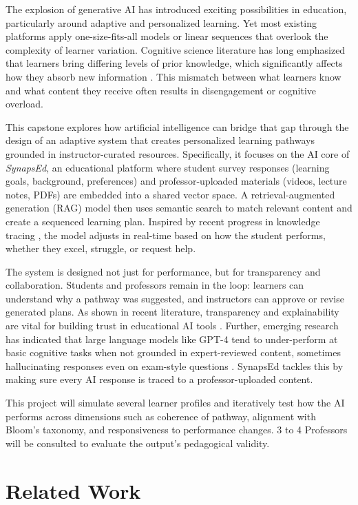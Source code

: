 \documentclass{stylefiles/capstone}
\begin{document}
The explosion of generative AI has introduced exciting possibilities in education, particularly around adaptive and personalized learning. Yet most existing platforms apply one-size-fits-all models or linear sequences that overlook the complexity of learner variation. Cognitive science literature has long emphasized that learners bring differing levels of prior knowledge, which significantly affects how they absorb new information \cite{ausubel1968educational}. This mismatch between what learners know and what content they receive often results in disengagement or cognitive overload.

This capstone explores how artificial intelligence can bridge that gap through the design of an adaptive system that creates personalized learning pathways grounded in instructor-curated resources. Specifically, it focuses on the AI core of \textit{SynapsEd}, an educational platform where student survey responses (learning goals, background, preferences) and professor-uploaded materials (videos, lecture notes, PDFs) are embedded into a shared vector space. A retrieval-augmented generation (RAG) model then uses semantic search to match relevant content and create a sequenced learning plan. Inspired by recent progress in knowledge tracing \cite{liu2025deepkt}, the model adjusts in real-time based on how the student performs, whether they excel, struggle, or request help.

The system is designed not just for performance, but for transparency and collaboration. Students and professors remain in the loop: learners can understand why a pathway was suggested, and instructors can approve or revise generated plans. As shown in recent literature, transparency and explainability are vital for building trust in educational AI tools \cite{chaudhry2022transparency}. Further, emerging research has indicated that large language models like GPT-4 tend to under-perform at basic cognitive tasks when not grounded in expert-reviewed content, sometimes hallucinating responses even on exam-style questions \cite{herrmann2024gpt}. SynapsEd tackles this by making sure every AI response is traced to a professor-uploaded content.

This project will simulate several learner profiles and iteratively test how the AI performs across dimensions such as coherence of pathway, alignment with Bloom’s taxonomy, and responsiveness to performance changes. 3 to 4 Professors will be consulted to evaluate the output’s pedagogical validity.

\section{Related Work}
\end{document}
